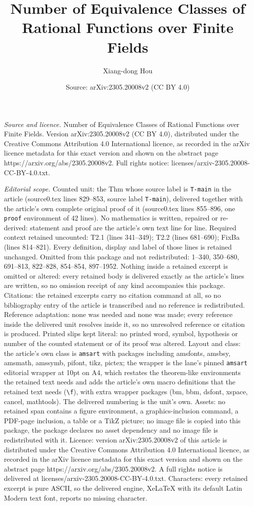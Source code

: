\documentclass[10pt,a4paper]{amsart}
\title[Number of Equivalence Classes of Rational Functions over Fin]{Number of Equivalence Classes of Rational Functions over Finite Fields}
\author{Xiang-dong Hou}
\date{Source: arXiv:2305.20008v2 (CC BY 4.0)}
\begin{document}
\maketitle

\noindent\emph{Source and licence.} Number of Equivalence Classes of Rational Functions over Finite Fields. Version arXiv:2305.20008v2 (CC BY 4.0), distributed under the Creative Commons Attribution 4.0 International licence, as recorded in the arXiv licence metadata for this exact version and shown on the abstract page https://arxiv.org/abs/2305.20008v2. Full rights notice: licenses/arxiv-2305.20008-CC-BY-4.0.txt.\par\smallskip

\noindent\textit{Editorial scope.} Counted unit: the Thm whose source label is \texttt{T-main} in the article (source0.tex lines 829--853, source label \texttt{T-main}), delivered together with the article's own complete original proof of it (source0.tex lines 855--896, one \texttt{proof} environment of 42 lines). No mathematics is written, repaired or re-derived: statement and proof are the article's own text line for line. Required context retained uncounted: T2.1 (lines 341--349); T2.2 (lines 681--690); FixBa (lines 814--821). Every definition, display and label of those lines is retained unchanged. Omitted from this package and not redistributed: 1--340, 350--680, 691--813, 822--828, 854--854, 897--1952. Nothing inside a retained excerpt is omitted or altered: every retained body is delivered exactly as the article's lines are written, so no omission receipt of any kind accompanies this package. Citations: the retained excerpts carry no citation command at all, so no bibliography entry of the article is transcribed and no reference is redistributed. Reference adaptation: none was needed and none was made; every reference inside the delivered unit resolves inside it, so no unresolved reference or citation is produced. Printed slips kept literal: no printed word, symbol, hypothesis or number of the counted statement or of its proof was altered. Layout and class: the article's own class is \texttt{amsart} with packages including amsfonts, amsbsy, amsmath, amssymb, pifont, tikz, pictex; the wrapper is the lane's pinned \texttt{amsart} editorial wrapper at 10pt on A4, which restates the theorem-like environments the retained text needs and adds the article's own macro definitions that the retained text needs (\texttt{\textbackslash f}), with extra wrapper packages (bm, bbm, dsfont, xspace, cancel, mathtools). The delivered numbering is the unit's own. Assets: no retained span contains a figure environment, a graphics-inclusion command, a PDF-page inclusion, a table or a TikZ picture; no image file is copied into this package, the package declares no asset dependency and no image file is redistributed with it. Licence: version arXiv:2305.20008v2 of this article is distributed under the Creative Commons Attribution 4.0 International licence, as recorded in the arXiv licence metadata for this exact version and shown on the abstract page https://arxiv.org/abs/2305.20008v2. A full rights notice is delivered at licenses/arxiv-2305.20008-CC-BY-4.0.txt. Characters: every retained excerpt is pure ASCII, so the delivered engine, XeLaTeX with its default Latin Modern text font, reports no missing character.
\end{document}
